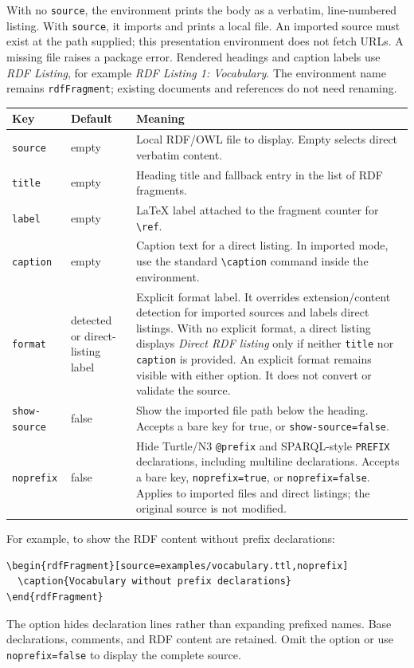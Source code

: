 \documentclass[10pt,letterpaper]{article}
\newcommand{\key}[1]{\texttt{#1}}
\begin{document}
With no \key{source}, the environment prints the body as a verbatim,
line-numbered listing. With \key{source}, it imports and prints a local file.
An imported source must exist at the path supplied; this presentation
environment does not fetch URLs. A missing file raises a package error.
Rendered headings and caption labels use \emph{RDF Listing}, for example
\emph{RDF Listing 1: Vocabulary}. The environment name remains
\verb|rdfFragment|; existing documents and references do not need renaming.

\begin{longtable}{p{.19\linewidth}p{.18\linewidth}p{.54\linewidth}}
\textbf{Key} & \textbf{Default} & \textbf{Meaning}\\
\hline
\key{source} & empty & Local RDF/OWL file to display. Empty selects direct
verbatim content.\\
\key{title} & empty & Heading title and fallback entry in the list of RDF
fragments.\\
\key{label} & empty & LaTeX label attached to the fragment counter for
\verb|\ref|.\\
\key{caption} & empty & Caption text for a direct listing. In imported mode,
use the standard \verb|\caption| command inside the environment.\\
\key{format} & detected or direct-listing label & Explicit format label. It
overrides extension/content detection for imported sources and labels direct
listings. With no explicit format, a direct listing displays
\emph{Direct RDF listing} only if neither \key{title} nor \key{caption} is
provided. An explicit format remains visible with either option.
It does not convert or validate the source.\\
\key{show-source} & false & Show the imported file path below the heading.
Accepts a bare key for true, or \verb|show-source=false|.\\
\key{noprefix} & false & Hide Turtle/N3 \texttt{@prefix} and
SPARQL-style \texttt{PREFIX} declarations, including multiline declarations.
Accepts a bare key, \verb|noprefix=true|, or \verb|noprefix=false|.
Applies to imported files and direct listings; the original source is not
modified.\\
\end{longtable}

For example, to show the RDF content without prefix declarations:
\begin{lstlisting}
\begin{rdfFragment}[source=examples/vocabulary.ttl,noprefix]
  \caption{Vocabulary without prefix declarations}
\end{rdfFragment}
\end{lstlisting}
The option hides declaration lines rather than expanding prefixed names.
Base declarations, comments, and RDF content are retained. Omit the option
or use \verb|noprefix=false| to display the complete source.
\end{document}
